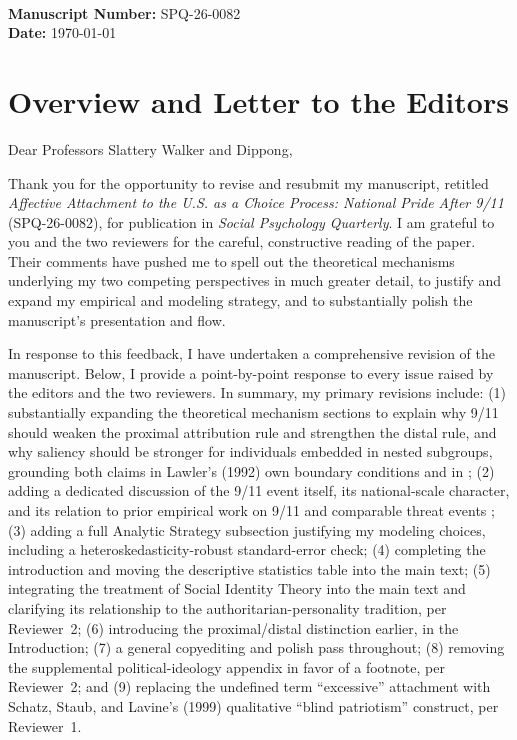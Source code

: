 \documentclass[11pt]{article}
\begin{document}
\\[6pt]
\textbf{Manuscript Number:} SPQ-26-0082\\
\textbf{Date:} \today\\[12pt]

\section*{Overview and Letter to the Editors}

Dear Professors Slattery Walker and Dippong,

Thank you for the opportunity to revise and resubmit my manuscript, retitled \textit{Affective Attachment to the U.S. as a Choice Process: National Pride After 9/11} (SPQ-26-0082), for publication in \textit{Social Psychology Quarterly}. I am grateful to you and the two reviewers for the careful, constructive reading of the paper. Their comments have pushed me to spell out the theoretical mechanisms underlying my two competing perspectives in much greater detail, to justify and expand my empirical and modeling strategy, and to substantially polish the manuscript's presentation and flow.

In response to this feedback, I have undertaken a comprehensive revision of the manuscript. Below, I provide a point-by-point response to every issue raised by the editors and the two reviewers. In summary, my primary revisions include: (1) substantially expanding the theoretical mechanism sections to explain why 9/11 should weaken the proximal attribution rule and strengthen the distal rule, and why saliency should be stronger for individuals embedded in nested subgroups, grounding both claims in Lawler's (1992) own boundary conditions and in \citet{lawler2006commitment-b3a}; (2) adding a dedicated discussion of the 9/11 event itself, its national-scale character, and its relation to prior empirical work on 9/11 and comparable threat events \citep{perrin2005national, schatz2007waving, sullivan1992patriotism}; (3) adding a full Analytic Strategy subsection justifying my modeling choices, including a heteroskedasticity-robust standard-error check; (4) completing the introduction and moving the descriptive statistics table into the main text; (5) integrating the treatment of Social Identity Theory into the main text and clarifying its relationship to the authoritarian-personality tradition, per Reviewer~2; (6) introducing the proximal/distal distinction earlier, in the Introduction; (7) a general copyediting and polish pass throughout; (8) removing the supplemental political-ideology appendix in favor of a footnote, per Reviewer~2; and (9) replacing the undefined term ``excessive'' attachment with Schatz, Staub, and Lavine's (1999) qualitative ``blind patriotism'' construct, per Reviewer~1.
\end{document}
